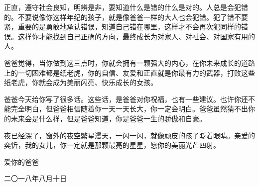 正直，遵守社会良知，明辨是非，要知道什么是错的什么是对的。人总是会犯错的。不要说像你这样年纪的孩子，就是像爸爸一样的大人也会犯错。犯了错不要紧，重要的是勇敢地承认错误，知道自己错在哪里，这样才不会再次犯同样的错误。这样你才能找到自己正确的方向，最终成长为对家人、对社会、对国家有用的人。

爸爸觉得，当你做到这三点时，你就会拥有一颗强大的内心，在你未来成长的道路上的一切困难都是纸老虎，你的自信、友爱和正直就是你最有力的武器，打败这些纸老虎，你就会成为美丽闪亮、快乐成长的女孩。

爸爸今天给你写了很多话。这些话，是爸爸对你祝福，也有一些建议。也许你还不能完全明白，但爸爸相信随着你一天一天长大，你一定会明白。爸爸虽然猜不出你的未来会是什么样，但是爸爸知道，你是爸爸一生的骄傲和自豪。

夜已经深了，窗外的夜空繁星漫天，一闪一闪，就像顽皮的孩子眨着眼睛。亲爱的奕忻，我的女儿，你一定就是那颗最亮的星星，愿你的美丽光芒四射。

\mbox{}

\leftskip=60mm 爱你的爸爸

\leftskip=53mm 二〇一八年八月十日
